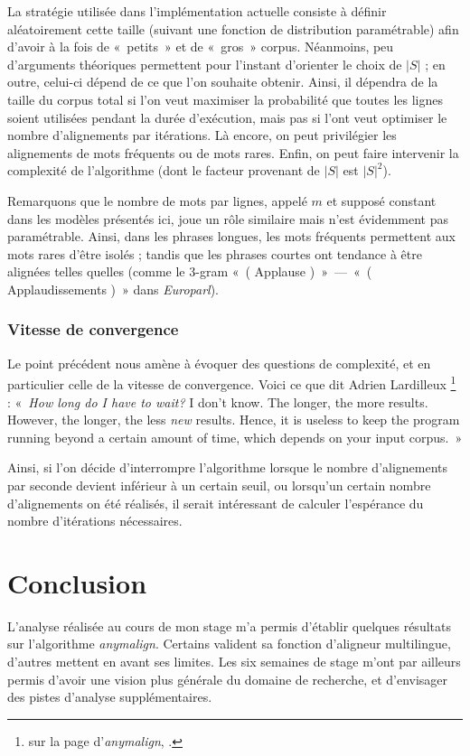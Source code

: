 \documentclass[a4paper,10pt]{article}
\newcommand{\anym}{\emph{anymalign}}
\newcommand{\guill}[1]{«~#1~»}
\begin{document}
La stratégie utilisée dans l'implémentation actuelle consiste à définir aléatoirement cette taille (suivant une fonction de distribution paramétrable) afin d'avoir à la fois de \guill{petits} et de \guill{gros} corpus. Néanmoins, peu d'arguments théoriques permettent pour l'instant d'orienter le choix de $|S|$ ; en outre, celui-ci dépend de ce que l'on souhaite obtenir. Ainsi, il dépendra de la taille du corpus total si l'on veut maximiser la probabilité que toutes les lignes soient utilisées pendant la durée d'exécution, mais pas si l'ont veut optimiser le nombre d'alignements par itérations. Là encore, on peut privilégier les alignements de mots fréquents ou de mots rares. Enfin, on peut faire intervenir la complexité de l'algorithme (dont le facteur provenant de $|S|$ est $|S|^2$).

Remarquons que le nombre de mots par lignes, appelé $m$ et supposé constant dans les modèles présentés ici, joue un rôle similaire mais n'est évidemment pas paramétrable. Ainsi, dans les phrases longues, les mots fréquents permettent aux mots rares d'être isolés ; tandis que les phrases courtes ont tendance à être alignées telles quelles (comme le $3$-gram \guill{( Applause )}~---~\guill{( Applaudissements )} dans \emph{Europarl}).

\subsubsection{Vitesse de convergence}

Le point précédent nous amène à évoquer des questions de complexité, et en particulier celle de la vitesse de convergence. Voici ce que dit Adrien Lardilleux \footnote{sur la page d'\anym, \cite{anymalign}.}
: \guill{\emph{How long do I have to wait?} I don't know. The longer, the more results. However, the longer, the less \emph{new} results. Hence, it is useless to keep the program running beyond a certain amount of time, which depends on your input corpus.}

Ainsi, si l'on décide d'interrompre l'algorithme lorsque le nombre d'alignements par seconde devient inférieur à un certain seuil, ou lorsqu'un certain nombre d'alignements on été réalisés, il serait intéressant de calculer l'espérance du nombre d'itérations nécessaires.


\section{Conclusion}

L'analyse réalisée au cours de mon stage m'a permis d'établir quelques résultats sur l'algorithme \anym. Certains valident sa fonction d'aligneur multilingue, d'autres mettent en avant ses limites. Les six semaines de stage m'ont par ailleurs permis d'avoir une vision plus générale du domaine de recherche, et d'envisager des pistes d'analyse supplémentaires.
\end{document}

